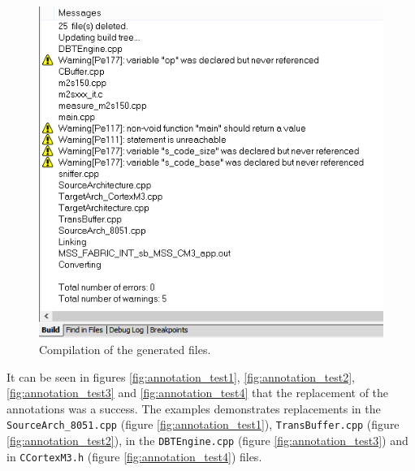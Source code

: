 \begin{figure}[H]
\centerline{
\includegraphics[scale=0.5]{images/compilar}
}
\caption{Compilation of the generated files.}
\label{fig:final_files2}
\end{figure}

It can be seen in figures \ref{fig:annotation_test1}, \ref{fig:annotation_test2}, \ref{fig:annotation_test3} and \ref{fig:annotation_test4} that the replacement of the annotations was  a success. The examples demonstrates replacements in the \texttt{SourceArch\_8051.cpp} (figure \ref{fig:annotation_test1}), \texttt{TransBuffer.cpp} (figure \ref{fig:annotation_test2}), in the \texttt{DBTEngine.cpp} (figure \ref{fig:annotation_test3}) and in \texttt{CCortexM3.h} (figure \ref{fig:annotation_test4}) files.

